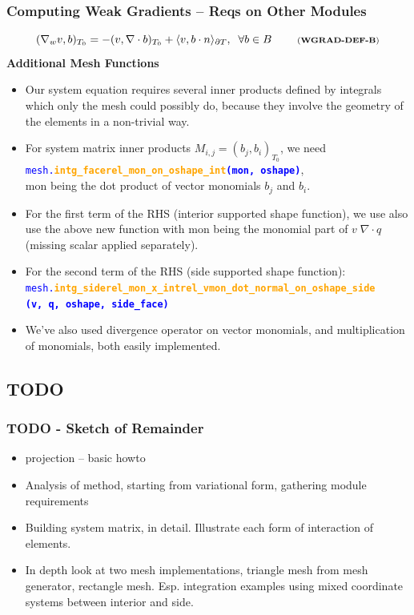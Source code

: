 \documentclass[compress]{beamer}
\begin{document}
\begin{frame}
  \frametitle{Computing Weak Gradients -- Reqs on Other Modules}
  \vspace{-.75cm}
  \begin{equation*}
    (\nabla_w v, b)_{T_0} = -(v, \nabla \cdot b)_{T_0} + \langle v, b \cdot n \rangle_{\partial T}, \;\; \forall b \in B 
    \;\quad\quad \text{\scriptsize (\textbf{WGRAD-DEF-B})}
  \end{equation*}
  \pause
  \textbf{Additional Mesh Functions}
  \begin{itemize}[<+->]
    \item Our system equation requires several inner products defined by integrals which only the mesh could possibly do, because they
      involve the geometry of the elements in a non-trivial way.
    \item For system matrix inner products $M_{i,j} = (b_j, b_i)_{T_0}$, we need\\
      {\small \texttt{\textcolor{blue}{mesh.\textbf{\textcolor{orange}{intg\_facerel\_mon\_on\_oshape\_int}(mon, oshape)}}}},\\
      mon being the dot product of vector monomials $b_j$ and $b_i$.
    \item For the first term of the RHS (interior supported shape function), we use also use the above new function with mon being
      the monomial part of $v \;\nabla \cdot q$ (missing scalar applied separately).
    \item For the second term of the RHS (side supported shape function):
      {\small \texttt{\textcolor{blue}{mesh.\textbf{\textcolor{orange}{intg\_siderel\_mon\_x\_intrel\_vmon\_dot\_normal\_on\_oshape\_side}\\
      \hspace{0.5cm}(v, q, oshape, side\_face)}}}}
    \item We've also used divergence operator on vector monomials, and multiplication of monomials, both easily implemented.
  \end{itemize}
\end{frame}
 

\subsection{TODO}
\begin{frame}
  \frametitle{TODO - Sketch of Remainder}
  \begin{itemize}[<+->]
    \item projection -- basic howto
    \item Analysis of method, starting from variational form, gathering module requirements
    \item Building system matrix, in detail.  Illustrate each form of interaction of elements.
    \item In depth look at two mesh implementations, triangle mesh from mesh generator, rectangle mesh.
      Esp. integration examples using mixed coordinate systems between interior and side.
  \end{itemize}
\end{frame}


  
\end{document}
